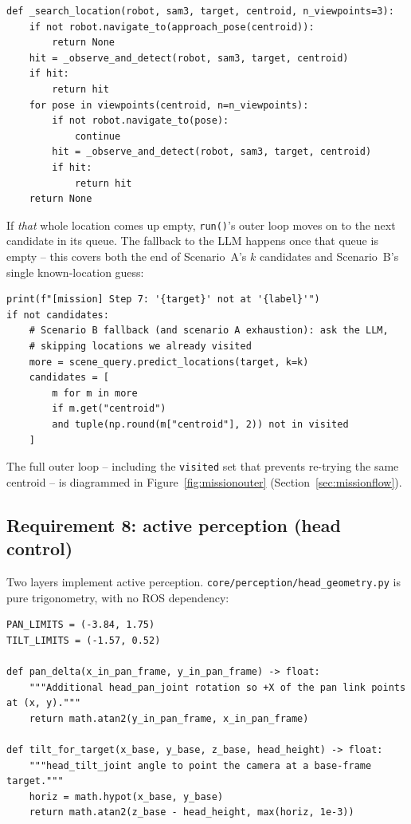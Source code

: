 \documentclass[11pt]{article}
\begin{document}
\begin{lstlisting}[caption={\texttt{search\_and\_fetch.py}: \texttt{\_search\_location()} (lines 75--89)}]
def _search_location(robot, sam3, target, centroid, n_viewpoints=3):
    if not robot.navigate_to(approach_pose(centroid)):
        return None
    hit = _observe_and_detect(robot, sam3, target, centroid)
    if hit:
        return hit
    for pose in viewpoints(centroid, n=n_viewpoints):
        if not robot.navigate_to(pose):
            continue
        hit = _observe_and_detect(robot, sam3, target, centroid)
        if hit:
            return hit
    return None
\end{lstlisting}

If \emph{that} whole location comes up empty, \texttt{run()}'s outer loop
moves on to the next candidate in its queue. The fallback to the LLM happens
once that queue is empty -- this covers both the end of Scenario~A's
$k$ candidates and Scenario~B's single known-location guess:

\begin{lstlisting}[caption={\texttt{search\_and\_fetch.py}: \texttt{run()} -- LLM fallback once the candidate queue is empty (lines 131--142)}]
print(f"[mission] Step 7: '{target}' not at '{label}'")
if not candidates:
    # Scenario B fallback (and scenario A exhaustion): ask the LLM,
    # skipping locations we already visited
    more = scene_query.predict_locations(target, k=k)
    candidates = [
        m for m in more
        if m.get("centroid")
        and tuple(np.round(m["centroid"], 2)) not in visited
    ]
\end{lstlisting}

The full outer loop -- including the \texttt{visited} set that prevents
re-trying the same centroid -- is diagrammed in Figure~\ref{fig:missionouter}
(Section~\ref{sec:missionflow}).

\subsection{Requirement 8: active perception (head control)}
\label{sec:headcontrol}

Two layers implement active perception. \texttt{core/perception/head\_geometry.py}
is pure trigonometry, with no ROS dependency:

\begin{lstlisting}[caption={\texttt{head\_geometry.py}: pan/tilt angles from a 3D target (lines 24--44)}]
PAN_LIMITS = (-3.84, 1.75)
TILT_LIMITS = (-1.57, 0.52)

def pan_delta(x_in_pan_frame, y_in_pan_frame) -> float:
    """Additional head_pan_joint rotation so +X of the pan link points at (x, y)."""
    return math.atan2(y_in_pan_frame, x_in_pan_frame)

def tilt_for_target(x_base, y_base, z_base, head_height) -> float:
    """head_tilt_joint angle to point the camera at a base-frame target."""
    horiz = math.hypot(x_base, y_base)
    return math.atan2(z_base - head_height, max(horiz, 1e-3))
\end{lstlisting}
\end{document}
